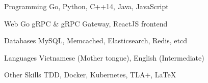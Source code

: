 


\begin{cvskills}


\cvskill
{Programming} %
{Go, Python, C++14, Java, JavaScript} %


\cvskill
{Web} %
{Go gRPC \& gRPC Gateway, ReactJS frontend} %

\cvskill
{Databases} %
{MySQL, Memcached, Elasticsearch, Redis, etcd} %


\cvskill
{Languages} %
{Vietnamese (Mother tongue), English (Intermediate)} %


\cvskill
{Other Skills} %
{TDD, Docker, Kubernetes, TLA+, LaTeX}%


\end{cvskills}

